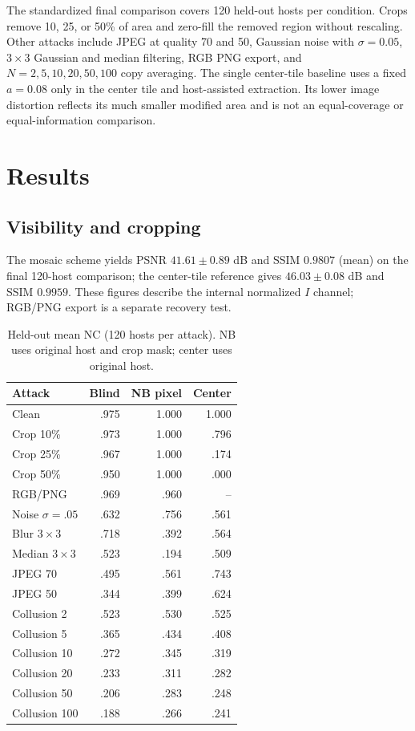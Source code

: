 \documentclass[conference]{IEEEtran}
\begin{document}
The standardized final comparison covers 120 held-out hosts per condition. Crops remove 10, 25, or 50\% of area and zero-fill the removed region without rescaling. Other attacks include JPEG at quality 70 and 50, Gaussian noise with $\sigma=0.05$, $3\times3$ Gaussian and median filtering, RGB PNG export, and $N=2,5,10,20,50,100$ copy averaging. The single center-tile baseline uses a fixed $a=0.08$ only in the center tile and host-assisted extraction. Its lower image distortion reflects its much smaller modified area and is not an equal-coverage or equal-information comparison.

\section{Results}
\subsection{Visibility and cropping}
The mosaic scheme yields PSNR $41.61\pm0.89$ dB and SSIM $0.9807$ (mean) on the final 120-host comparison; the center-tile reference gives $46.03\pm0.08$ dB and SSIM $0.9959$. These figures describe the internal normalized $I$ channel; RGB/PNG export is a separate recovery test.

\begin{table}[t]
\caption{Held-out mean NC (120 hosts per attack). NB uses original host and crop mask; center uses original host.}
\centering\footnotesize\setlength{\tabcolsep}{3pt}
\begin{tabular}{lrrr}\toprule
Attack & Blind & NB pixel & Center\\\midrule
Clean & .975 & 1.000 & 1.000\\
Crop 10\% & .973 & 1.000 & .796\\
Crop 25\% & .967 & 1.000 & .174\\
Crop 50\% & .950 & 1.000 & .000\\
RGB/PNG & .969 & .960 & --\\
Noise $\sigma=.05$ & .632 & .756 & .561\\
Blur $3\times3$ & .718 & .392 & .564\\
Median $3\times3$ & .523 & .194 & .509\\
JPEG 70 & .495 & .561 & .743\\
JPEG 50 & .344 & .399 & .624\\
Collusion 2 & .523 & .530 & .525\\
Collusion 5 & .365 & .434 & .408\\
Collusion 10 & .272 & .345 & .319\\
Collusion 20 & .233 & .311 & .282\\
Collusion 50 & .206 & .283 & .248\\
Collusion 100 & .188 & .266 & .241\\\bottomrule
\end{tabular}\label{tab:nc}
\end{table}
\end{document}

